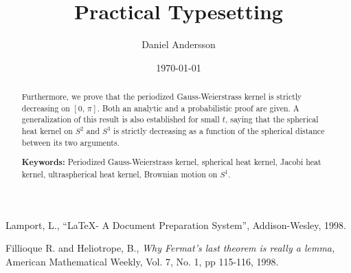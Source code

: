 \documentclass[11pt,a4paper]{article} %
\begin{document}
\title{\huge Practical Typesetting}
\author{Daniel Andersson}
\date{\today}
\maketitle


\begin{abstract}

Furthermore, we prove that the periodized Gauss-Weierstrass kernel is strictly decreasing on $[0,\,\pi]$. Both an analytic and a probabilistic proof are given. A generalization of this result is also established for small $t$, saying that the spherical heat kernel on $S^2$ and $S^3$ is strictly decreasing as a function of the spherical distance between its two arguments.  
\newline

\noindent \textbf{Keywords:} Periodized Gauss-Weierstrass kernel, spherical heat kernel, Jacobi heat kernel, ultraspherical heat kernel, Brownian motion on $S^1$.
\end{abstract}



{}
\setcounter{page}{1}
\pagestyle{fancy}
\renewcommand{\sectionmark}[1]{ \markright{#1}{} }
\setspecialhdr
\tableofcontents

\begin{comment}
\newpage
\end{comment}
\setdefaulthdr
{}	
\setcounter{page}{1}





\begin{thebibliography}{9}
         {\sc Lamport, L.,}
         ``\LaTeX - A Document Preparation System'',
         Addison-Wesley, 1998.

         {\sc Fillioque R.} and {\sc Heliotrope, B.,}
         {\em Why Fermat's last theorem is really a lemma,}
         American Mathematical Weekly,
         Vol. 7, No. 1, pp 115-116, 1998.

\end{thebibliography}

\setdefaulthdr
%
\end{document}
